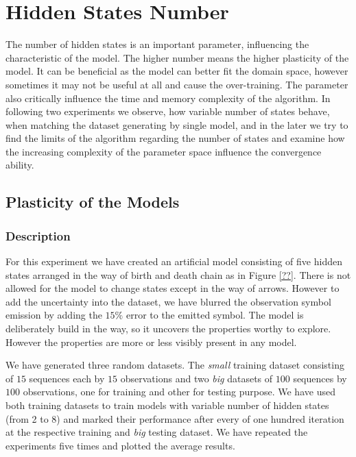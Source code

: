 \documentclass[thesis=M,english]{FITthesis}[2012/10/20]
\begin{document}
\section{Hidden States Number}\label{sec:hsn}

The number of hidden states is an important parameter, influencing the characteristic of the model. The higher number means the higher plasticity of the model. It can be beneficial as the model can better fit the domain space, however sometimes it may not be useful at all and cause the over-training. The parameter also critically influence the time and memory complexity of the algorithm. In following two experiments we observe, how variable number of states behave, when matching the dataset generating by single model, and in the later we try to find the limits of the algorithm regarding the number of states and examine how the increasing complexity of the parameter space influence the convergence ability.    

\subsection{Plasticity of the Models}\label{sec:plast}

\subsubsection*{ Description }
For this experiment we have created an artificial model consisting of five hidden states arranged in the way of birth and death chain as in Figure \ref{??}. There is not allowed for the model to change states except in the way of arrows. However to add the uncertainty into the dataset, we have blurred the observation symbol emission by adding the $15\%$ error to the emitted symbol. The model is deliberately build in the way, so it uncovers the properties worthy to explore. However the properties are more or less visibly present in any model. 

 
We have generated three random datasets. The \textit{small} training dataset consisting of $15$ sequences each by $15$ observations and two \textit{big} datasets of $100$ sequences by $100$ observations, one for training and other for testing purpose. We have used both training datasets to train models with variable number of hidden states (from 2 to 8) and marked their performance after every of one hundred iteration at the respective training and \textit{big} testing dataset. We have repeated the experiments five times and plotted the average results.   
\end{document}

